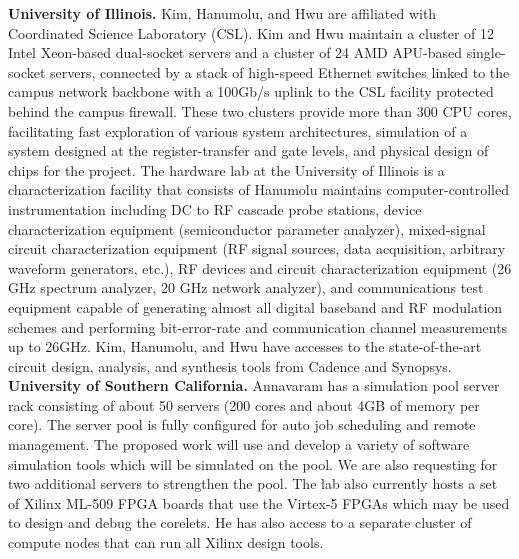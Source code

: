 \vspace{3pt}
\noindent
\textbf{University of Illinois.}
Kim, Hanumolu, and Hwu are affiliated with Coordinated Science Laboratory (CSL). 
Kim and Hwu maintain a cluster of 12 Intel Xeon-based dual-socket servers and a cluster of 24 AMD APU-based single-socket servers, 
connected by a stack of high-speed Ethernet switches linked to the campus network backbone with a 100Gb/s uplink to the CSL facility protected behind the campus firewall.
These two clusters provide more than 300 CPU cores, facilitating fast exploration of various system architectures, simulation of a system designed at the register-transfer and gate levels, and physical design of chips for the project.
The hardware lab at the University of Illinois is a characterization facility that consists of 
Hanumolu maintains computer-controlled instrumentation including DC to RF cascade probe stations, device characterization equipment (semiconductor parameter analyzer), 
mixed-signal circuit characterization equipment (RF signal sources, data acquisition, arbitrary waveform generators, etc.), RF devices and circuit characterization equipment (26 GHz spectrum analyzer, 20 GHz network analyzer), and communications test equipment capable of generating almost all digital baseband and RF modulation schemes and performing bit-error-rate and communication channel measurements up to 26GHz. 
Kim, Hanumolu, and Hwu have accesses to the state-of-the-art circuit design, analysis, and synthesis tools from Cadence and Synopsys.
\vspace{3pt}
\noindent
\textbf{University of Southern California.}
Annavaram has a simulation pool server rack consisting of about 50 servers (200 cores and about 4GB of memory per core). The server pool is fully configured for auto job scheduling and remote management. The proposed work will use and develop a variety of software simulation tools which will be simulated on the pool. We are also requesting for two additional servers to strengthen the pool. The lab also currently hosts a set of Xilinx ML-509 FPGA boards that use the Virtex-5 FPGAs which may be used to design and debug the corelets. He has also access to a separate cluster of compute nodes that can run all Xilinx design tools. 
